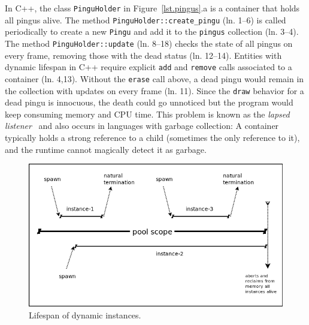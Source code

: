 \documentclass{vgtc}                          %
\newcommand{\code}[1] {{\small{\texttt{#1}}}}
\begin{document}
In C++, the class \code{PinguHolder} in Figure~\ref{lst.pingus}.a is a
container that holds all pingus alive.
%
The method \code{PinguHolder::create\_pingu} (ln. 1--6) is called periodically
to create a new \code{Pingu} and add it to the \code{pingus} collection
(ln. 3--4).
The method \code{PinguHolder::update} (ln. 8--18) checks the state of all
pingus on every frame, removing those with the dead status (ln. 12--14).
%
Entities with dynamic lifespan in C++ require explicit \code{add} and
\code{remove} calls associated to a container (ln. 4,13).
Without the \code{erase} call above, a dead pingu would remain in the
collection with updates on every frame (ln. 11).
Since the \code{draw} behavior for a dead pingu is innocuous, the death could
go unnoticed but the program would keep consuming memory and CPU time.
This problem is known as the \emph{lapsed listener}~\cite{games.patterns} and
also occurs in languages with garbage collection:
A container typically holds a strong reference to a child (sometimes the only 
reference to it), and the runtime cannot magically detect it as garbage.

\begin{figure}[t]
\centering
\includegraphics[width=\columnwidth]{pool}
\caption{Lifespan of dynamic instances.
\label{fig.pool}
}
\end{figure}
\end{document}

